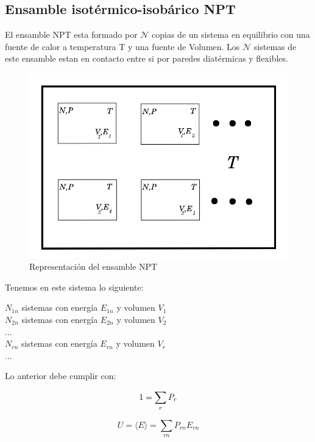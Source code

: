 \subsection{Ensamble isotérmico-isobárico NPT}

El ensamble NPT esta formado por $\mathcal{N}$ copias de un sistema en equilibrio con una fuente de calor a temperatura T y una fuente de Volumen. Los $\mathcal{N}$ sistemas de este ensamble estan en contacto entre si por paredes diatérmicas y flexibles.\\

\begin{figure}[!h]
    \centering
    \includegraphics[width=.55\textwidth,keepaspectratio=true]{nptensemble.png}
    \caption{Representación del ensamble NPT \cite{belof2013alternative}}
    \label{fig:NPTEns}
\end{figure}

\newpage

Tenemos en este sistema lo siguiente:\\

\begin{center}
    $N_{1n}$ sistemas con energía $E_{1n}$ y volumen $V_1$\\
    $N_{2n}$ sistemas con energía $E_{2n}$ y volumen $V_2$\\
    ...\\
    $N_{rn}$ sistemas con energía $E_{rn}$ y volumen $V_r$\\
    ...\\
\end{center}

Lo anterior debe cumplir con:

\begin{equation} \label{restrprobNPT}
    1 = \sum_r P_r \\
\end{equation}

\begin{equation} \label{energiaprobNPT}
    U = \langle E\rangle = \sum_{rn} P_{rn} E_{rn}
\end{equation}

